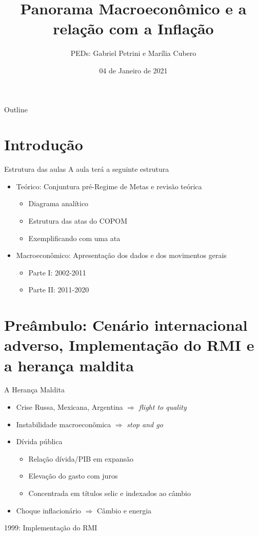 \documentclass[presentation]{beamer}
\author{PEDs: Gabriel Petrini e Marília Cubero}
\date{04 de Janeiro de 2021}
\title{Panorama Macroeconômico e a relação com a Inflação}
\begin{document}
\maketitle
\begin{frame}{Outline}
\tableofcontents
\end{frame}

\section{Introdução}
\label{sec:org5f8770f}

\begin{frame}[label={sec:orgfb4e93e}]{Estrutura das aulas}
A aula terá a seguinte estrutura
\begin{itemize}
\item \alert{Teórico:} Conjuntura pré-Regime de Metas e revisão teórica
\begin{itemize}
\item Diagrama analítico
\item Estrutura das atas do COPOM
\item Exemplificando com uma ata
\end{itemize}
\item \alert{Macroeconômico:} Apresentação dos dados e dos movimentos gerais
\begin{itemize}
\item Parte I: 2002-2011
\item Parte II: 2011-2020
\end{itemize}
\end{itemize}
\end{frame}


\section{Preâmbulo: Cenário internacional adverso, Implementação do RMI e a herança maldita}
\label{sec:orgda09e31}

\begin{frame}[label={sec:orgf038ad2}]{A Herança Maldita \cite{belluzzoDepoisQuedaEconomia2002}}
\begin{itemize}
\item Crise Russa, Mexicana, Argentina \(\Rightarrow\) \emph{flight to quality}
\item Instabilidade macroeconômica \(\Rightarrow\) \emph{stop and go}
\item Dívida pública
\begin{itemize}
\item Relação dívida/PIB em expansão
\item Elevação do gasto com juros
\item Concentrada em títulos selic e indexados ao câmbio
\end{itemize}
\item Choque inflacionário \(\Rightarrow\) Câmbio e energia
\end{itemize}

\begin{block}{1999: Implementação do RMI}
\end{block}
\end{frame}
\end{document}
